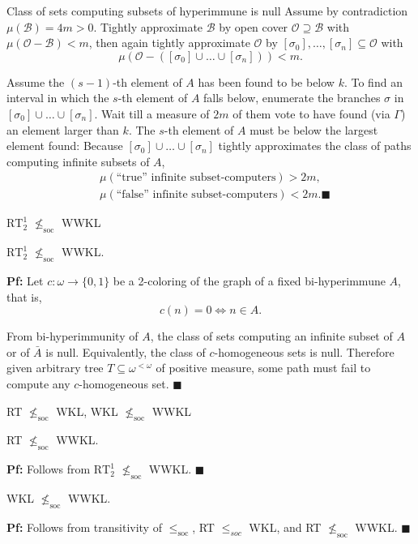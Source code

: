 \begin{frame}{Class of sets computing subsets of hyperimmune is null}
  Assume by contradiction $\mu(\mathcal{B})=4m>0$.  Tightly approximate
  $\mathcal{B}$ by open cover $\mathcal{O}\supseteq\mathcal{B}$ with
  $\mu(\mathcal{O}-\mathcal{B})<m$, then again tightly approximate
  $\mathcal{O}$ by $[\sigma_0],\ldots,[\sigma_n] \subseteq\mathcal{O}$ with
  \[\mu(\mathcal{O}-([\sigma_0]\cup\ldots\cup[\sigma_n])) <m.\]

  Assume the $(s-1)$-th element of $A$ has been found to be below $k$. To
  find an interval in which the $s$-th element of $A$ falls below,
  enumerate the branches $\sigma$ in $[\sigma_0]\cup\ldots\cup[\sigma_n]$.
  Wait till a measure of $2m$ of them vote to have found (via
  $\Gamma$) an element larger than $k$. The $s$-th element of
  $A$ must be below the largest element found: Because
  $[\sigma_0]\cup\ldots\cup[\sigma_n]$ tightly approximates the class of
  paths computing infinite subsets of $A$,
  \begin{align*}
    &\mu(\text{``true'' infinite subset-computers})>2m,\\
    &\mu(\text{``false'' infinite subset-computers})<2m. \blacksquare
  \end{align*}
\end{frame}

\begin{frame}{$\text{RT}_2^1$ $\nleq_{\text{soc}}$ WWKL}
  \begin{thm}
    $\text{RT}_2^1$ $\nleq_{\text{soc}}$ WWKL.
  \end{thm}

  \vspace{1em}
  \textbf{Pf:} Let $c:\omega\rightarrow\{0,1\}$ be a 2-coloring of the
  graph of a fixed bi-hyperimmune $A$, that is,
  \[c(n)=0 \Leftrightarrow n\in A.\]
  
  From bi-hyperimmunity of $A$, the class of sets computing an infinite
  subset of $A$ or of $\bar{A}$ is null. Equivalently, the class of
  $c$-homogeneous sets is null. Therefore given arbitrary tree
  $T\subseteq\omega^{<\omega}$ of positive measure, some path must fail to
  compute any $c$-homogeneous set. $\blacksquare$
\end{frame}

\begin{frame}{RT $\nleq_{\text{soc}}$ WKL, WKL $\nleq_{\text{soc}}$ WWKL}
  \begin{coro}
    \label{coro:rt-wwkl}
    RT $\nleq_{\text{soc}}$ WWKL.
  \end{coro}
  \textbf{Pf:} Follows from $\text{RT}_2^1$ $\nleq_{\text{soc}}$ WWKL.
  $\blacksquare$

  \vspace{2em}
  \begin{coro}
    WKL $\nleq_{\text{soc}}$ WWKL.
  \end{coro}
  \textbf{Pf:} Follows from transitivity of $\leq_\text{soc}$,
  RT $\leq_{soc}$ WKL, and RT $\nleq_{\text{soc}}$ WWKL. $\blacksquare$
\end{frame}
